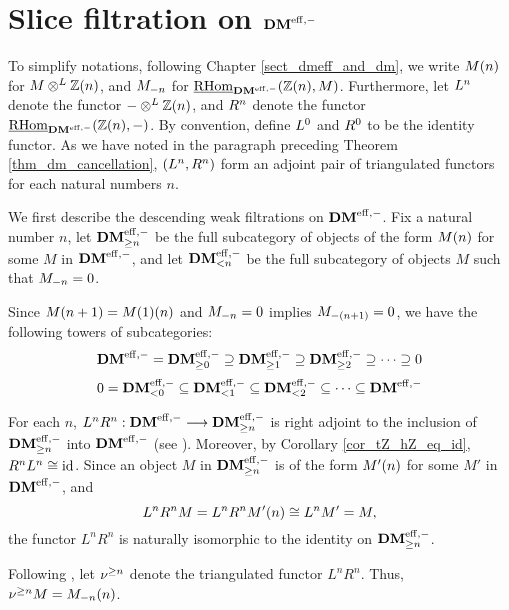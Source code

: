 \section{Slice filtration on $\DMeff$}
\label{sect_slice_filtration_DMeff}
To simplify notations, following Chapter \ref{sect_dmeff_and_dm},
we write $\tZ[n]{M}$ for $M \tDM \Z(n)$, and $\hZ[n]{M}$ for 
$\ihomDMf(\Z(n), M)$. Furthermore, let $\LDMf{n}$ denote the
functor $- \tDM \Z(n)$, and $\RDMf{n}$ denote the functor 
$\ihomDMf(\Z(n), -)$. By convention, define $\LDMf{0}$ and 
$\RDMf{0}$ to be the identity functor. As we have noted in
the paragraph preceding Theorem \ref{thm_dm_cancellation}, 
$(\LDMf{n}, \RDMf{n})$ form an adjoint pair of triangulated 
functors for each natural numbers $n$.

We first describe the descending weak filtrations on $\DMeff$. Fix
a natural number $n$, let $\GFiltDM[n]{\DMeff}$ be the full 
subcategory of objects of the form $\tZ[n]{M}$ for some $M$ in 
$\DMeff$, and let $\LFiltDM[n]{\DMeff}$ be the full subcategory of 
objects $M$ such that $\hZ[n]{M} = 0$.

Since $\tZ[n + 1]{M} = \tZ[n]{\tZ[1]{M}}$ and $\hZ[n]{M} = 0$ 
implies $\hZ[(n + 1)]{M} = 0$, we have the following towers of 
subcategories:
\begin{equation}\label{eq_gslice_tower_DMeff}
\DMeff = \GFiltDM[0]{\DMeff} \supseteq \GFiltDM[1]{\DMeff} 
   \supseteq \GFiltDM[2]{\DMeff} \supseteq \cdots \supseteq 0
\end{equation}
\begin{equation}\label{eq_lslice_tower_DMeff}
0 = \LFiltDM[0]{\DMeff} \subseteq \LFiltDM[1]{\DMeff} \subseteq 
   \LFiltDM[2]{\DMeff} \subseteq \cdots \subseteq \DMeff
\end{equation}

For each $n$, $L^n R^n : \DMeff \to \GFiltDM[n]{\DMeff}$ is right
adjoint to the inclusion of $\GFiltDM[n]{\DMeff}$ into $\DMeff$
(see \cite[1.1]{HuKa}). Moreover, by Corollary 
\ref{cor_tZ_hZ_eq_id}, $R^nL^n \cong \id$. Since an object $M$ in 
$\GFiltDM[n]{\DMeff}$ is of the form $\tZ[n]{M'}$ for some $M'$ in 
$\DMeff$, and
\[
L^nR^n M = L^nR^n \tZ[n]{M'} \cong L^n M' = M,
\]
the functor $L^nR^n$ is naturally isomorphic to the identity on
$\GFiltDM[n]{\DMeff}$. 

\begin{defn}\label{def_sgDM}
Following \cite{HuKa}, let $\sgDM{n}$ denote the triangulated functor
$L^nR^n$. Thus, $\sgDM{n}M=\LHI[n]{\RHI[n]{M}}$. 
\end{defn}

